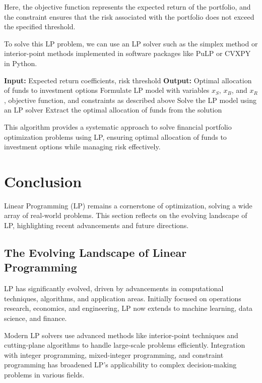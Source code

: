 \documentclass[12pt]{book} %
\begin{document}
Here, the objective function represents the expected return of the portfolio, and the constraint ensures that the risk associated with the portfolio does not exceed the specified threshold.

To solve this LP problem, we can use an LP solver such as the simplex method or interior-point methods implemented in software packages like PuLP or CVXPY in Python.

\FloatBarrier
\begin{algorithm}
    \caption{Financial Portfolio Optimization using Linear Programming}
    \begin{algorithmic}[1]
        \State \textbf{Input:} Expected return coefficients, risk threshold
        \State \textbf{Output:} Optimal allocation of funds to investment options
        \State Formulate LP model with variables \(x_S\), \(x_B\), and \(x_R\), objective function, and constraints as described above
        \State Solve the LP model using an LP solver
        \State Extract the optimal allocation of funds from the solution
    \end{algorithmic}
\end{algorithm}
\FloatBarrier

This algorithm provides a systematic approach to solve financial portfolio optimization problems using LP, ensuring optimal allocation of funds to investment options while managing risk effectively.


\section{Conclusion}

Linear Programming (LP) remains a cornerstone of optimization, solving a wide array of real-world problems. This section reflects on the evolving landscape of LP, highlighting recent advancements and future directions.

\subsection{The Evolving Landscape of Linear Programming}

LP has significantly evolved, driven by advancements in computational techniques, algorithms, and application areas. Initially focused on operations research, economics, and engineering, LP now extends to machine learning, data science, and finance.

Modern LP solvers use advanced methods like interior-point techniques and cutting-plane algorithms to handle large-scale problems efficiently. Integration with integer programming, mixed-integer programming, and constraint programming has broadened LP's applicability to complex decision-making problems in various fields.
\end{document}
